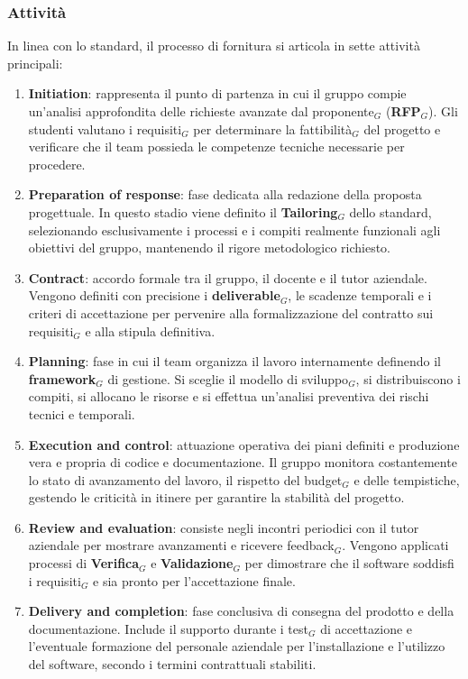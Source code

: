 \documentclass[a4paper, 10pt]{article}
\begin{document}
\subsubsection{Attività}
In linea con lo standard, il processo di fornitura si articola in sette attività principali:
\begin{enumerate}
    \item \textbf{Initiation}: rappresenta il punto di partenza in cui il gruppo compie un'analisi approfondita delle richieste avanzate dal proponente$_G$ (\textbf{RFP$_G$}). Gli studenti valutano i requisiti$_G$ per determinare la fattibilità$_G$ del progetto e verificare che il team possieda le competenze tecniche necessarie per procedere.
    
    \item \textbf{Preparation of response}: fase dedicata alla redazione della proposta progettuale. In questo stadio viene definito il \textbf{Tailoring$_G$} dello standard, selezionando esclusivamente i processi e i compiti realmente funzionali agli obiettivi del gruppo, mantenendo il rigore metodologico richiesto.
    
    \item \textbf{Contract}: accordo formale tra il gruppo, il docente e il tutor aziendale. Vengono definiti con precisione i \textbf{deliverable$_G$}, le scadenze temporali e i criteri di accettazione per pervenire alla formalizzazione del contratto sui requisiti$_G$ e alla stipula definitiva.
    
    \item \textbf{Planning}: fase in cui il team organizza il lavoro internamente definendo il \textbf{framework$_G$} di gestione. Si sceglie il modello di sviluppo$_G$, si distribuiscono i compiti, si allocano le risorse e si effettua un'analisi preventiva dei rischi tecnici e temporali.
    
    \item \textbf{Execution and control}: attuazione operativa dei piani definiti e produzione vera e propria di codice e documentazione. Il gruppo monitora costantemente lo stato di avanzamento del lavoro, il rispetto del budget$_G$ e delle tempistiche, gestendo le criticità in itinere per garantire la stabilità del progetto.
    
    \item \textbf{Review and evaluation}: consiste negli incontri periodici con il tutor aziendale per mostrare avanzamenti e ricevere feedback$_G$. Vengono applicati processi di \textbf{Verifica$_G$} e \textbf{Validazione$_G$} per dimostrare che il software soddisfi i requisiti$_G$ e sia pronto per l'accettazione finale.
    
    \item \textbf{Delivery and completion}: fase conclusiva di consegna del prodotto e della documentazione. Include il supporto durante i test$_G$ di accettazione e l'eventuale formazione del personale aziendale per l'installazione e l'utilizzo del software, secondo i termini contrattuali stabiliti.
\end{enumerate}
\end{document}
